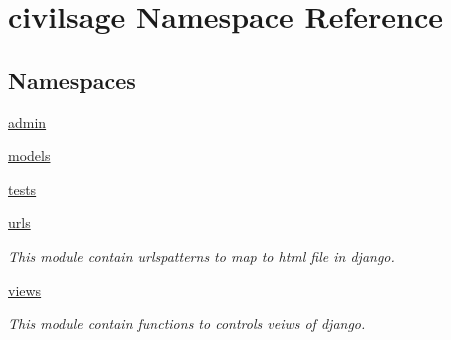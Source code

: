 \hypertarget{namespacecivilsage}{}\section{civilsage Namespace Reference}
\label{namespacecivilsage}
\subsection*{Namespaces}
\begin{DoxyCompactItemize}
\item 
 \hyperlink{namespacecivilsage_1_1admin}{admin}
\item 
 \hyperlink{namespacecivilsage_1_1models}{models}
\item 
 \hyperlink{namespacecivilsage_1_1tests}{tests}
\item 
 \hyperlink{namespacecivilsage_1_1urls}{urls}
\begin{DoxyCompactList}\small\item\em This module contain urlspatterns to map to html file in django. \end{DoxyCompactList}\item 
 \hyperlink{namespacecivilsage_1_1views}{views}
\begin{DoxyCompactList}\small\item\em This module contain functions to controls veiws of django. \end{DoxyCompactList}\end{DoxyCompactItemize}
